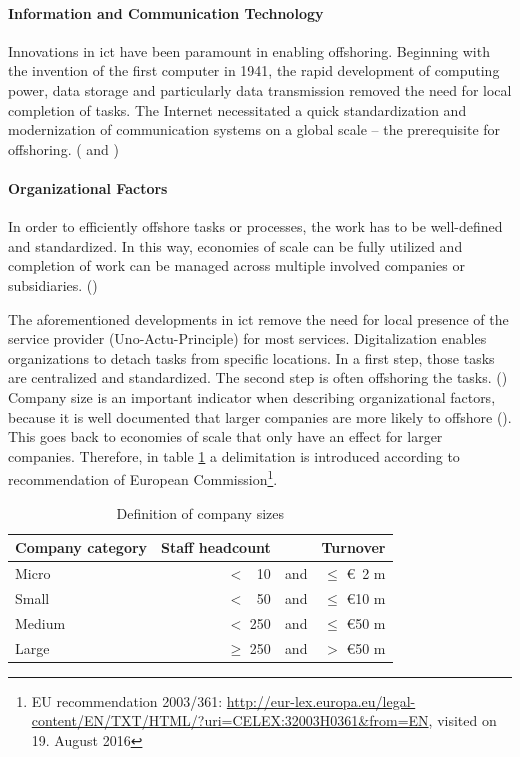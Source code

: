 \paragraph{Information and Communication Technology}
Innovations in \gls{ict} have been paramount in enabling offshoring. Beginning with the invention of the first computer in 1941, the rapid development of computing power, data storage and particularly data transmission removed the need for local completion of tasks. The Internet necessitated a quick standardization and modernization of communication systems on a global scale -- the prerequisite for offshoring. (\cite[pp. 9f]{Hutzschenreuter.2007} and \cite[p. 93]{Jahns.2007})

\paragraph{Organizational Factors}
In order to efficiently offshore tasks or processes, the work has to be well-defined and standardized. In this way, economies of scale can be fully utilized and completion of work can be managed across multiple involved companies or subsidiaries. (\cite[p. 11]{Hutzschenreuter.2007})

The aforementioned developments in \gls{ict} remove the need for local presence of the service provider (Uno-Actu-Principle) for most services. Digitalization enables organizations to detach tasks from specific locations. In a first step, those tasks are centralized and standardized. The second step is often offshoring the tasks. (\cite[pp. 12f]{Hutzschenreuter.2007})
\newpage
Company size is an important indicator when describing organizational factors, because it is well documented that larger companies are more likely to offshore (\cite[p. 38]{Hutzschenreuter.2007}). This goes back to economies of scale that only have an effect for larger companies. Therefore, in table \ref{tab:CompanySize} a delimitation is introduced according to recommendation of European Commission\footnote{EU recommendation 2003/361: \url{http://eur-lex.europa.eu/legal-content/EN/TXT/HTML/?uri=CELEX:32003H0361&from=EN}, visited on 19. August 2016}.
\vspace{3mm}
\begin{table}[htb!]
	\centering
	\begin{tabular}{l | r c r}
		\textbf{Company category} & \textbf{Staff headcount} && \textbf{Turnover}\\ \hline
		\rule{0pt}{3ex}   Micro & $<$ \, 10 &  and & $\le$ \euro \, 2 m\\ \hline
		\rule{0pt}{3ex}   Small & $<$ \, 50 & and & $\le$ \euro 10 m\\ \hline
		\rule{0pt}{3ex}   Medium & $<$ 250 & and & $\le$ \euro 50 m\\ \hline
		\rule{0pt}{3ex}   Large & $\ge$ 250 & and & $>$ \euro 50 m\\
	\end{tabular}
	\vspace{3mm}
	\caption{Definition of company sizes}
	\label{tab:CompanySize}
\end{table}

